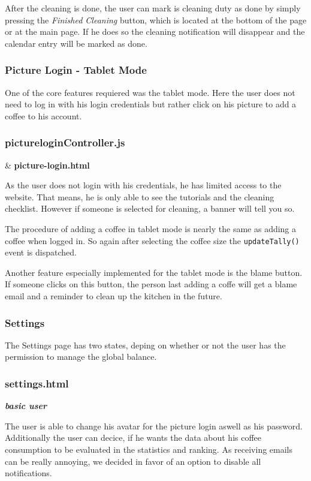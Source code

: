 After the cleaning is done, the user can mark is cleaning duty as done
by simply pressing the \emph{Finished Cleaning} button, which is located
at the bottom of the page or at the main page. If he does so the
cleaning notification will disappear and the calendar entry will be
marked as done.

\subsubsection{Picture Login - Tablet
Mode}\label{picture-login---tablet-mode}

One of the core features requiered was the tablet mode. Here the user
does not need to log in with his login credentials but rather click on
his picture to add a coffee to his account.

\subsubsection*{pictureloginController.js} \& \textbf{picture-login.html}

As the user does not login with his credentials, he has limited access
to the website. That means, he is only able to see the tutorials and the
cleaning checklist. However if someone is selected for cleaning, a
banner will tell you so.

The procedure of adding a coffee in tablet mode is nearly the same as
adding a coffee when logged in. So again after selecting the coffee size
the \texttt{updateTally()} event is dispatched.

Another feature especially implemented for the tablet mode is the blame
button. If someone clicks on this button, the person last adding a coffe
will get a blame email and a reminder to clean up the kitchen in the
future.

\subsubsection{Settings}\label{settings-1}

The Settings page has two states, deping on whether or not the user has
the permission to manage the global balance.

\subsubsection*{settings.html}

\textbf{\emph{basic user}}

The user is able to change his avatar for the picture login aswell as
his password. Additionally the user can decice, if he wants the data
about his coffee consumption to be evaluated in the statistics and
ranking. As receiving emails can be really annoying, we decided in favor
of an option to disable all notifications.

